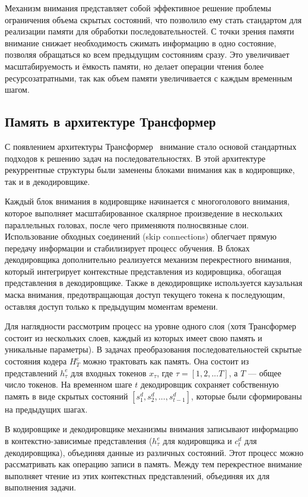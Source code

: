 Механизм внимания представляет собой эффективное решение проблемы ограничения объема скрытых состояний, что позволило ему стать стандартом для реализации памяти для обработки последовательностей. С точки зрения памяти внимание снижает необходимость сжимать информацию в одно состояние, позволяя обращаться ко всем предыдущим состояниям сразу. Это увеличивает масштабируемость и ёмкость памяти, но делает операции чтения более ресурсозатратными, так как объем памяти увеличивается с каждым временным шагом.

\subsection{Память в архитектуре Трансформер}

С появлением архитектуры Трансформер~\cite{vaswani2017attention} внимание стало основой стандартных подходов к решению задач на последовательностях. В этой архитектуре рекуррентные структуры были заменены блоками внимания как в кодировщике, так и в декодировщике.

Каждый блок внимания в кодировщике начинается с многоголового внимания, которое выполняет масштабированное скалярное произведение в нескольких параллельных головах, после чего применяютя полносвязные слои. Использование обходных соединений (skip connections) облегчает прямую передачу информации и стабилизирует процесс обучения. В блоках декодировщика дополнительно реализуется механизм перекрестного внимания, который интегрирует контекстные представления из кодировщика, обогащая представления в декодировщике. Также в декодировщике используется каузальная маска внимания, предотвращающая доступ текущего токена к последующим, оставляя доступ только к предыдущим моментам времени.

Для наглядности рассмотрим процесс на уровне одного слоя (хотя Трансформер состоит из нескольких слоев, каждый из которых имеет свою память и уникальные параметры). В задачах преобразования последовательностей скрытые состояния кодера $H_T^e$ можно трактовать как память. Она состоит из представлений $h_{\tau}^e$ для входных токенов $x_{\tau}$, где $\tau = [1, 2, ... T]$, а $T$ — общее число токенов. На временном шаге $t$ декодировщик сохраняет собственную память в виде скрытых состояний $[s_1^d, s_2^d, ..., s_{t-1}^d]$, которые были сформированы на предыдущих шагах.

В кодировщике и декодировщике механизмы внимания записывают информацию в контекстно-зависимые представления ($h_{\tau}^e$ для кодировщика и $c_t^d$ для декодировщика), объединяя данные из различных состояний. Этот процесс можно рассматривать как операцию записи в память. Между тем перекрестное внимание выполняет чтение из этих контекстных представлений, объединяя их для выполнения задачи.


